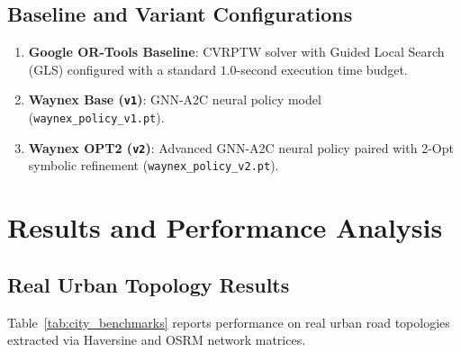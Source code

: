\documentclass[10pt,journal,compsoc]{IEEEtran}
\begin{document}
\subsection{Baseline and Variant Configurations}
\begin{enumerate}
    \item \textbf{Google OR-Tools Baseline}: CVRPTW solver with Guided Local Search (GLS) configured with a standard $1.0$-second execution time budget.
    \item \textbf{Waynex Base (\texttt{v1})}: GNN-A2C neural policy model (\texttt{waynex\_policy\_v1.pt}).
    \item \textbf{Waynex OPT2 (\texttt{v2})}: Advanced GNN-A2C neural policy paired with 2-Opt symbolic refinement (\texttt{waynex\_policy\_v2.pt}).
\end{enumerate}

\section{Results and Performance Analysis}

\subsection{Real Urban Topology Results}
Table~\ref{tab:city_benchmarks} reports performance on real urban road topologies extracted via Haversine and OSRM network matrices.

\begin{table}[h]
\centering
\caption{Performance Comparison on Real Urban Road Topologies}
\label{tab:city_benchmarks}
\end{table}
\end{document}
